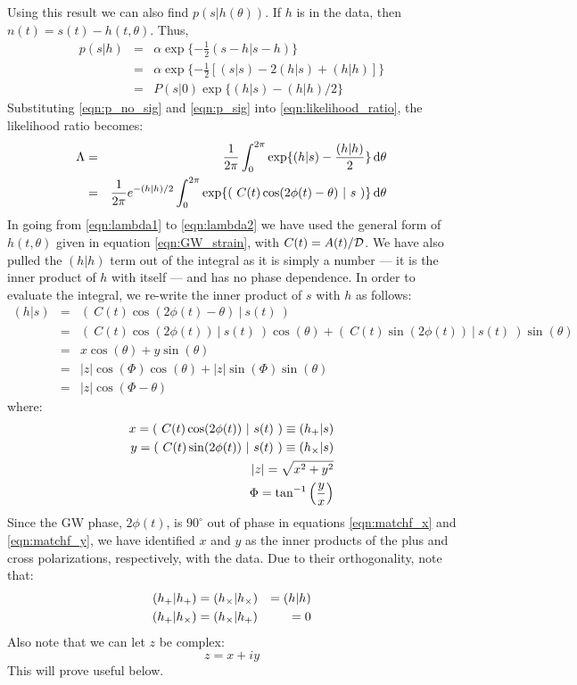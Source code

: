 Using this result we can also find $p(s|h(\theta))$. If $h$ is in the data, then $n(t) = s(t) - h(t, \theta)$. Thus,
\begin{eqnarray}
\label{eqn:p_sig}
p(s|h) & = & \alpha \exp\{ -\frac{1}{2} (s - h | s - h ) \} \nonumber \\
 & = & \alpha \exp\{ -\frac{1}{2} [ (s|s) - 2(h|s) + (h|h) ] \} \nonumber \\
 & = & P(s|0) \exp\{ (h|s) - (h|h)/2 \}
\end{eqnarray}
Substituting \ref{eqn:p_no_sig} and \ref{eqn:p_sig} into \ref{eqn:likelihood_ratio}, the likelihood ratio becomes:
\begin{eqnarray}
\label{eqn:lambda1}
\Lambda & = & \frac{1}{2\pi} \int_0^{2\pi} \exp\{ (h|s)- \frac{(h|h)}{2} \} \d\theta \\
\label{eqn:lambda2}
 & = & \frac{1}{2\pi} e^{-(h|h)/2} \int_0^{2\pi} \exp\{ (~C(t)\cos(2\phi(t) - \theta)~|~s~) \} \d\theta
\end{eqnarray}
In going from \ref{eqn:lambda1} to \ref{eqn:lambda2} we have used the general form of $h(t,\theta)$ given in equation \ref{eqn:GW_strain}, with $C(t) = A(t)/\mathcal{D}$. We have also pulled the $(h|h)$ term out of the integral as it is simply a number --- it is the inner product of $h$ with itself --- and has no phase dependence. In order to evaluate the integral, we re-write the inner product of $s$ with $h$ as follows:
\begin{eqnarray}
\label{eqn:sh_in_z}
(h|s) & = &  (~C(t) \cos(2\phi(t) - \theta)~|~s(t)~) \nonumber \\
 & = & (~C(t)\cos(2\phi(t))~|~s(t)~) \cos(\theta) + (~C(t)\sin(2\phi(t))~|~s(t)~) \sin(\theta) \nonumber \\
 & = & x \cos(\theta) + y\sin(\theta) \nonumber \\
 & = & |z|\cos(\Phi)\cos(\theta) + |z|\sin(\Phi)\sin(\theta) \nonumber \\
 & = & |z|\cos(\Phi - \theta)
\end{eqnarray}
where:
\begin{align}
\label{eqn:matchf_x}
x = (~C(t)\cos(2\phi(t))~|~s(t)~) \equiv (h_{\pls}|s) \\
\label{eqn:matchf_y}
y = (~C(t)\sin(2\phi(t))~|~s(t)~) \equiv (h_{\crs}|s) \\
|z| = \sqrt{ x^2 + y^2 } \\
\Phi =  \tan^{-1}\left( \frac{y}{x} \right) 
\end{align}
Since the \ac{GW} phase, $2\phi(t)$, is $90^{\circ}$ out of phase in equations \ref{eqn:matchf_x} and \ref{eqn:matchf_y}, we have identified $x$ and $y$ as the inner products of the plus and cross polarizations, respectively, with the data. Due to their orthogonality, note that:
\begin{align}
(h_{+}|h_{+}) &= (h_{\times}|h_{\times}) &= (h|h) \\
(h_{+}|h_{\times}) &= (h_{\times}|h_{+}) &= 0
\end{align}
Also note that we can let $z$ be complex:
\begin{equation}
\label{eqn:complex_z}
z = x + iy
\end{equation}
This will prove useful below.

